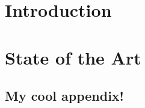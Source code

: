 \documentclass[a4paper, 12pt]{report}
\begin{document}
\newpage
\thispagestyle{empty}
\mbox{}
\chapter{Introduction}


\chapter{State of the Art}
\label{chap:stateofart}






\titleformat{\chapter}[display]	%
{\normalfont\huge\bfseries}{\chaptertitlename\ \thechapter}{20pt}{\Huge}
\begin{appendix}			%
\chapter{My cool appendix!}	%
\label{app:cool}
%
%
\end{appendix}
\end{document}
